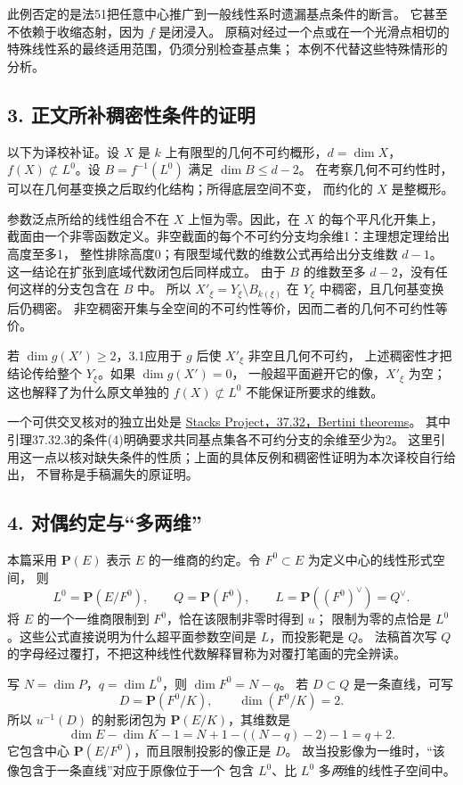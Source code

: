 \documentclass[UTF8,a4paper]{ctexbook}
\begin{document}
此例否定的是法51把任意中心推广到一般线性系时遗漏基点条件的断言。
它甚至不依赖于收缩态射，因为 $f$ 是闭浸入。
原稿对经过一个点或在一个光滑点相切的特殊线性系的最终适用范围，仍须分别检查基点集；
本例不代替这些特殊情形的分析。

\subsection*{3. 正文所补稠密性条件的证明}

以下为译校补证。设 $X$ 是 $k$ 上有限型的几何不可约概形，$d=\dim X$，
$f(X)\not\subset L^0$。设 $B=f^{-1}(L^0)$ 满足 $\dim B\le d-2$。
在考察几何不可约性时，可以在几何基变换之后取约化结构；所得底层空间不变，
而约化的 $X$ 是整概形。

参数泛点所给的线性组合不在 $X$ 上恒为零。因此，在 $X$ 的每个平凡化开集上，
截面由一个非零函数定义。非空截面的每个不可约分支均余维1：主理想定理给出高度至多1，
整性排除高度0；有限型域代数的维数公式再给出分支维数 $d-1$。
这一结论在扩张到底域代数闭包后同样成立。
由于 $B$ 的维数至多 $d-2$，没有任何这样的分支包含在 $B$ 中。
所以 $X'_\xi=Y_\xi\setminus B_{k(\xi)}$ 在 $Y_\xi$ 中稠密，且几何基变换后仍稠密。
非空稠密开集与全空间的不可约性等价，因而二者的几何不可约性等价。

若 $\dim g(X')\ge2$，3.1应用于 $g$ 后使 $X'_\xi$ 非空且几何不可约，
上述稠密性才把结论传给整个 $Y_\xi$。如果 $\dim g(X')=0$，
一般超平面避开它的像，$X'_\xi$ 为空；这也解释了为什么原文单独的
$f(X)\not\subset L^0$ 不能保证所要求的维数。

一个可供交叉核对的独立出处是
\href{https://stacks.math.columbia.edu/tag/0G4C}{Stacks Project，37.32，Bertini theorems}。
其中引理37.32.3的条件(4)明确要求共同基点集各不可约分支的余维至少为2。
这里引用这一点以核对缺失条件的性质；上面的具体反例和稠密性证明为本次译校自行给出，
不冒称是手稿漏失的原证明。

\subsection*{4. 对偶约定与“多两维”}

本篇采用 $\mathbf P(E)$ 表示 $E$ 的一维商的约定。令 $F^0\subset E$ 为定义中心的线性形式空间，
则
\[
 L^0=\mathbf P(E/F^0),\qquad Q=\mathbf P(F^0),\qquad
 L=\mathbf P((F^0)^\vee)=Q^\vee.
\]
将 $E$ 的一个一维商限制到 $F^0$，恰在该限制非零时得到 $u$；
限制为零的点恰是 $L^0$。这些公式直接说明为什么超平面参数空间是 $L$，而投影靶是 $Q$。
法稿首次写 $Q$ 的字母经过覆打，不把这种线性代数解释冒称为对覆打笔画的完全辨读。

写 $N=\dim P$，$q=\dim L^0$，则 $\dim F^0=N-q$。
若 $D\subset Q$ 是一条直线，可写
\[
 D=\mathbf P(F^0/K),\qquad \dim(F^0/K)=2.
\]
所以 $u^{-1}(D)$ 的射影闭包为 $\mathbf P(E/K)$，其维数是
\[
 \dim E-\dim K-1
 =N+1-\bigl((N-q)-2\bigr)-1=q+2.
\]
它包含中心 $\mathbf P(E/F^0)$，而且限制投影的像正是 $D$。
故当投影像为一维时，“该像包含于一条直线”对应于原像位于一个
包含 $L^0$、比 $L^0$ 多\emph{两}维的线性子空间中。
\end{document}
